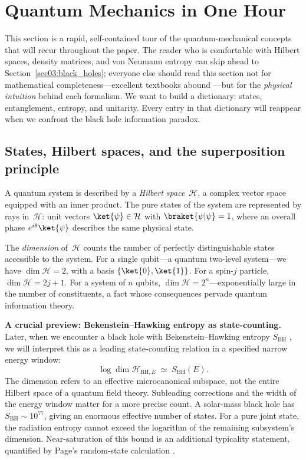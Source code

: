 \documentclass[11pt,letterpaper]{article}
\theoremstyle{plain}
\theoremstyle{definition}
\theoremstyle{remark}
\newcommand{\Hcal}{\mathcal{H}}
\begin{document}
\section{Quantum Mechanics in One Hour}\label{sec02:quantum_mechanics}

This section is a rapid, self-contained tour of the quantum-mechanical concepts that
will recur throughout the paper.  The reader who is comfortable with Hilbert spaces,
density matrices, and von Neumann entropy can skip ahead to
Section~\ref{sec03:black_holes}; everyone else should read this section not for
mathematical completeness---excellent textbooks abound \cite{nielsen2000,sakurai2020}---but
for the \emph{physical intuition} behind each formalism.  We want to build a dictionary:
states, entanglement, entropy, and unitarity.  Every entry in that dictionary will
reappear when we confront the black hole information paradox.

\subsection{States, Hilbert spaces, and the superposition principle}
\label{subsec02:hilbert_spaces}

A quantum system is described by a \emph{Hilbert space}~$\Hcal$, a complex vector space
equipped with an inner product.  The pure states of the system are represented by
rays in~$\Hcal$: unit vectors $\ket{\psi}\in\Hcal$ with $\braket{\psi|\psi}=1$, where
an overall phase $e^{i\theta}\ket{\psi}$ describes the same physical state.

The \emph{dimension} of~$\Hcal$ counts the number of perfectly distinguishable states
accessible to the system.  For a single qubit---a quantum two-level system---we have
$\dim\Hcal = 2$, with a basis $\{\ket{0},\ket{1}\}$.  For a spin-$j$ particle,
$\dim\Hcal = 2j+1$.  For a system of $n$ qubits, $\dim\Hcal = 2^n$---exponentially
large in the number of constituents, a fact whose consequences pervade quantum information
theory.

\medskip
\noindent\textbf{A crucial preview: Bekenstein--Hawking entropy as state-counting.}
Later, when we encounter a black hole with Bekenstein--Hawking entropy
$S_{\mathrm{BH}}$ \cite{bekenstein1973,hawking1975}, we will interpret this
as a leading state-counting relation in a specified narrow energy window:
\begin{equation}\label{eq02:dim_bh}
  \log \dim \Hcal_{\mathrm{BH},E} \;\simeq\; S_{\mathrm{BH}}(E).
\end{equation}
The dimension refers to an effective microcanonical subspace, not the entire
Hilbert space of a quantum field theory. Subleading corrections and the width
of the energy window matter for a more precise count. A solar-mass black hole
has $S_{\mathrm{BH}}\sim 10^{77}$, giving an enormous effective number of
states. For a pure joint state, the radiation entropy cannot exceed the
logarithm of the remaining subsystem's dimension. Near-saturation of this
bound is an additional typicality statement, quantified by Page's
random-state calculation \cite{page1993}.
\end{document}
